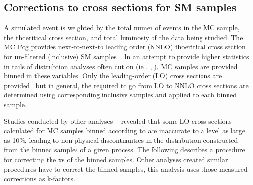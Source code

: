 \subsection{Corrections to cross sections for SM samples\label{sec:k-factors}}

A simulated event is weighted by the total numer of events in the MC sample, 
the thoeritical cross section, and total luminosiy of the data being studied.
The MC Pog provides next-to-next-to leading order (NNLO) thoeritical cross section
for un-filtered (inclusive) SM samples~\cite{twiki-xs}. In an attempt to 
provide higher statistics in tails of distrubtion analyses often cut on 
(ie \partonht, \nparton, \pthat), MC samples are provided binned in these
 variables. Only the leading-order (LO) cross sections are provided~\cite{prep} 
but in general, the \kfactors required to go from LO to NNLO cross sections
are determined using corresponding inclusive samples and applied to each binned sample. 

Studies conducted by other analyses ~\cite{RobXS} revealed that some LO cross
sections calculated for MC samples binned according to \partonht are
inaccurate to a level as large as 10\%, leading to non-physical
discontinuities in the \partonht distribution constructed from the
binned samples of a given process.  The following describes a procedure for 
correcting the xs of the \wlnu \partonht binned samples.  Other analyses created similar 
procedures have to correct the \zmumu \partonht binned samples, this analysis
uses those measured corrections as k-factors.  

